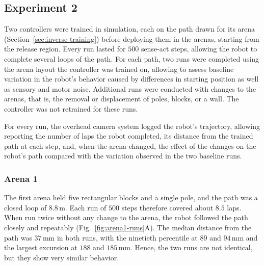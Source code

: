 \documentclass[11pt]{article}
\begin{document}
\subsection{Experiment 2}

Two controllers were trained in simulation, each on the path drawn for its arena (Section~\ref{sec:inverse-training}) before deploying them in the arenas, starting from the release region. Every run lasted for $500$ sense-act steps, allowing the robot to complete several loops of the path. For each path, two runs were completed using the arena layout the controller was trained on, allowing to assess baseline variation in the robot's behavior caused by differences in starting position as well as sensory and motor noise. Additional runs were conducted with changes to the arenas, that is, the removal or displacement of poles, blocks, or a wall. The controller was not retrained for these runs.

For every run, the overhead camera system logged the robot's trajectory, allowing reporting the number of laps the robot completed, its distance from the trained path at each step, and, when the arena changed, the effect of the changes on the robot’s path compared with the variation observed in the two baseline runs. 

\subsubsection{Arena 1}

The first arena held five rectangular blocks and a single pole, and the path was a closed loop of $8.8$\,m. Each run of $500$ steps therefore covered about $8.5$ laps. When run twice without any change to the arena, the robot followed the path closely and repeatably (Fig.~\ref{fig:arena1-runs}A). The median distance from the path was $37$\,mm in both runs, with the ninetieth percentile at $89$ and $94$\,mm and the largest excursion at $188$ and $185$\,mm. Hence, the two runs are not identical, but they show very similar behavior.
\end{document}
